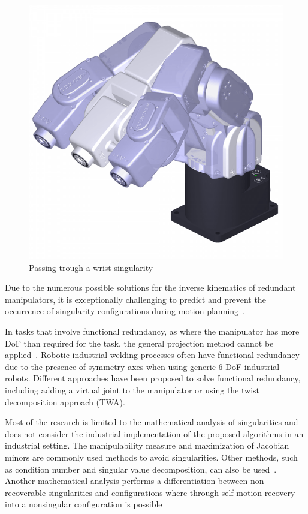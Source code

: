 \begin{figure}[H]
	\centerline{\includegraphics[scale=.25]{figures/wristsingular.png}}
	\caption{Passing trough a wrist singularity~\cite{meca}}
	\label{wristsingular}
\end{figure}
\newpage
Due to the numerous possible solutions for the inverse kinematics of redundant manipulators, it is exceptionally challenging to predict and prevent the occurrence of singularity configurations during motion planning~\cite{Shi.2021}.

In tasks that involve functional redundancy, as where the manipulator has more \acrshort{DoF} than required for the task, the general projection method cannot be applied~\cite{Wei.2014}. Robotic industrial welding processes often have functional redundancy due to the presence of symmetry axes when using generic 6-\acrshort{DoF} industrial robots. Different approaches have been proposed to solve functional redundancy, including adding a virtual joint to the manipulator or using the twist decomposition approach (\acrshort{TWA}).

Most of the research is limited to the mathematical analysis of singularities and does not consider the industrial implementation of the proposed algorithms in an industrial setting. The manipulability measure and maximization of Jacobian minors are commonly used methods to avoid singularities. Other methods, such as condition number and singular value decomposition, can also be used~\cite{Stevenson.}. Another mathematical analysis performs a differentiation between non-recoverable singularities and configurations where through self-motion recovery into a nonsingular configuration is possible~\cite{Bedrossian.2002}

